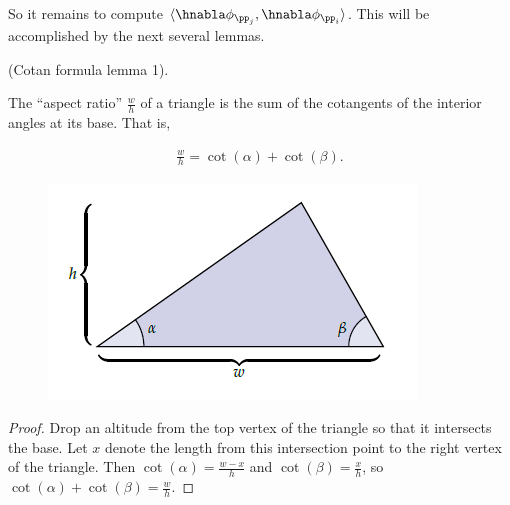 So it remains to compute $\langle \hnabla \phi_{\pp_j}, \hnabla \phi_{\pp_i} \rangle$. This will be accomplished by the next several lemmas.

\begin{lemma}
\label{ch::ddg:lemma::cotan_w_h_lemma}

    (Cotan formula lemma 1).
    
    The ``aspect ratio'' $\frac{w}{h}$ of a triangle is the sum of the cotangents of the interior angles at its base. That is,
    
    \begin{align*}
        \frac{w}{h} = \cot(\alpha) + \cot(\beta).
    \end{align*}
    
    \begin{figure}[H]
        \centering
        \includegraphics{images/fem_cotan_lemma1.PNG}
        \caption{\cite[p. 105]{book::DDG}}
    \end{figure}
\end{lemma}

\begin{proof}
    Drop an altitude from the top vertex of the triangle so that it intersects the base. Let $x$ denote the length from this intersection point to the right vertex of the triangle. Then $\cot(\alpha) = \frac{w - x}{h}$ and $\cot(\beta) = \frac{x}{h}$, so $\cot(\alpha) + \cot(\beta) = \frac{w}{h}$.
\end{proof}


